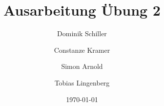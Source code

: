 \documentclass[
ngerman,
twoside,
pdfa=false,
ruledheaders=section,%
class=report,%
thesis={type=sta},%
accentcolor=TUDa-2c,%
custommargins=false,%
marginpar=false,%
parskip=half-,%
fontsize=11pt,%
]{tudapub}
\begin{document}
	\title{Ausarbeitung Übung 2}
	\author[D. Schiller, C. Kramer, S.Arnold, T. Lingenberg]{Dominik Schiller \and Constanze Kramer \and Simon Arnold \and Tobias Lingenberg} %
	
	\department{} %

	
	\date{\today}
	
	
	\maketitle
	
	
	\affidavit
	
	
	
	\cleardoublepage
	\tableofcontents %
	
	\setcounter{page}{1} %
	
	
	
	
	
	
	
	
	
	
	\listoffigures %
	\listoftables %
	
	
	
\end{document}
